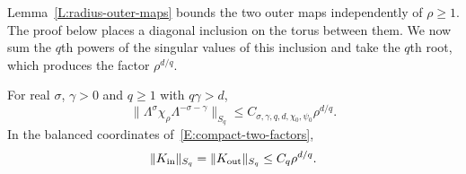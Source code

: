 Lemma~\ref{L:radius-outer-maps} bounds the two outer maps independently of
$\rho \ge 1$. The proof below places a diagonal inclusion on the torus between
them. We now sum the $q$th powers of the singular values of this inclusion and
take the $q$th root, which produces the factor $\rho^{d/q}$.

\begin{proposition}
  \label{P:radius-compact-envelopes}
  For real $\sigma$, $\gamma > 0$ and $q \ge 1$ with $q\gamma > d$,
  \begin{equation}\label{E:radius-cutoff-Schatten}
    \|\Lambda^\sigma\chi_\rho\Lambda^{-\sigma-\gamma}\|_{S_q}
    \le C_{\sigma,\gamma,q,d,\chi_0,\psi_0}\rho^{d/q}.
  \end{equation}
  In the balanced coordinates of~\eqref{E:compact-two-factors},
  \begin{equation}\label{E:radius-two-envelopes}
    \|K_{\rm in}\|_{S_q}=\|K_{\rm out}\|_{S_q}
    \le C_q\rho^{d/q}.
  \end{equation}
\end{proposition}

